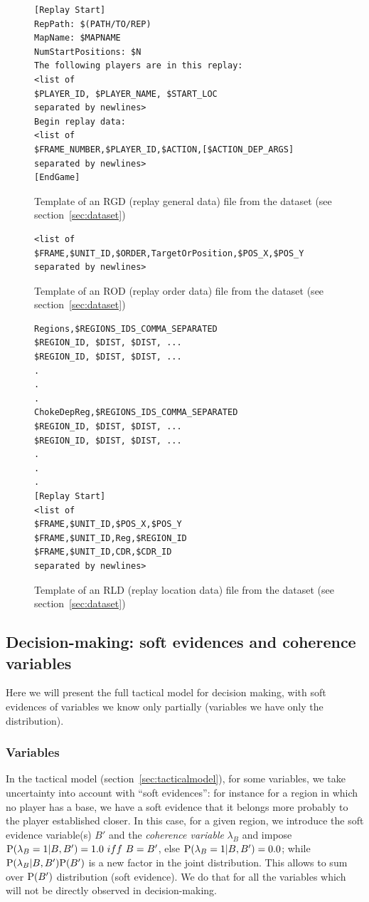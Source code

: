 \begin{figure}[!h]
\begin{verbatim}
[Replay Start]
RepPath: $(PATH/TO/REP)
MapName: $MAPNAME
NumStartPositions: $N
The following players are in this replay:
<list of 
$PLAYER_ID, $PLAYER_NAME, $START_LOC
separated by newlines>
Begin replay data:
<list of
$FRAME_NUMBER,$PLAYER_ID,$ACTION,[$ACTION_DEP_ARGS]
separated by newlines>
[EndGame]
\end{verbatim}
\caption{Template of an RGD (replay general data) file from the dataset (see section~\ref{sec:dataset})}
\label{fig:rgdfile}
\end{figure}

\begin{figure}[!h]
\begin{verbatim}
<list of
$FRAME,$UNIT_ID,$ORDER,TargetOrPosition,$POS_X,$POS_Y
separated by newlines>
\end{verbatim}
\caption{Template of an ROD (replay order data) file from the dataset (see section~\ref{sec:dataset})}
\label{fig:rodfile}
\end{figure}

\begin{figure}[!h]
\begin{verbatim}
Regions,$REGIONS_IDS_COMMA_SEPARATED
$REGION_ID, $DIST, $DIST, ...
$REGION_ID, $DIST, $DIST, ...
.
.
.
ChokeDepReg,$REGIONS_IDS_COMMA_SEPARATED
$REGION_ID, $DIST, $DIST, ...
$REGION_ID, $DIST, $DIST, ...
.
.
.
[Replay Start]
<list of
$FRAME,$UNIT_ID,$POS_X,$POS_Y
$FRAME,$UNIT_ID,Reg,$REGION_ID
$FRAME,$UNIT_ID,CDR,$CDR_ID
separated by newlines>
\end{verbatim}
\caption{Template of an RLD (replay location data) file from the dataset (see section~\ref{sec:dataset})}
\label{fig:rldfile}
\end{figure}

\subsection{Decision-making: soft evidences and coherence variables}
\label{appdx:softevidences}

Here we will present the full tactical model for decision making, with soft evidences of variables we know only partially (variables we have only the distribution).

\subsubsection{Variables}
In the tactical model (section~\ref{sec:tacticalmodel}), for some variables, we take uncertainty into account with ``soft evidences'': for instance for a region in which no player has a base, we have a soft evidence that it belongs more probably to the player established closer. In this case, for a given region, we introduce the soft evidence variable(s) $B'$ and the \textit{coherence variable} $\lambda_B$ and impose $\PP(\lambda_B=1|B,B')=1.0\ iff\ B=B'$, else $\mathrm{P}(\lambda_B=1|B,B')=0.0$; while $\mathrm{P}(\lambda_B|B,B')\mathrm{P}(B')$ is a new factor in the joint distribution. This allows to sum over $\mathrm{P}(B')$ distribution (soft evidence). We do that for all the variables which will not be directly observed in decision-making.

